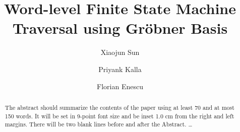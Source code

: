 \documentclass[envcountsame]{llncs}
\begin{document}
%
%
% 

%
\mainmatter              %
%
\title{Word-level Finite State Machine Traversal using Gr\"obner Basis}
%
%
\author{Xiaojun Sun \and Priyank Kalla \and Florian Enescu}
%
%

\maketitle              %



\begin{abstract}
The abstract should summarize the contents of the paper
using at least 70 and at most 150 words. It will be set in 9-point
font size and be inset 1.0 cm from the right and left margins.
There will be two blank lines before and after the Abstract. \dots
{}
\end{abstract}
%
%






%


% 
\end{document}
